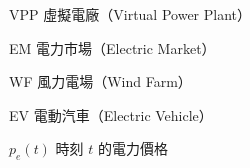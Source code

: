 
\begin{denotation}[3cm]

\item[VPP]{虛擬電廠（Virtual Power Plant）}
\item[EM]{電力市場（Electric Market）}
\item[WF]{風力電場（Wind Farm）}
\item[EV]{電動汽車（Electric Vehicle）}
\item[$p_e(t)$]{時刻 $t$ 的電力價格}

\end{denotation}
